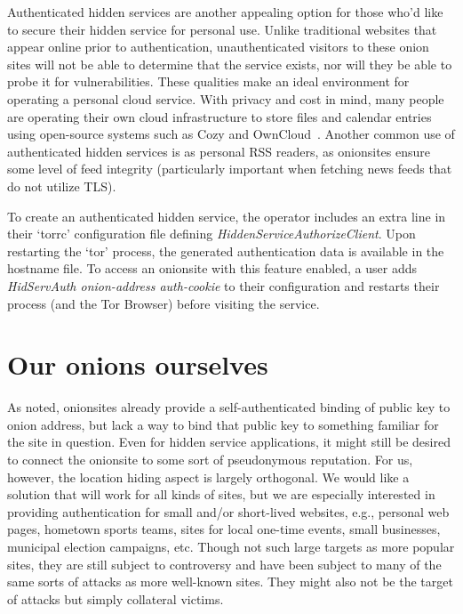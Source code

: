 \documentclass[10pt, conference, compsocconf]{styles/IEEEtran}
\begin{document}
Authenticated hidden services are another appealing option for those
who'd like to secure their hidden service for personal use.  Unlike
traditional websites that appear online prior to authentication,
unauthenticated visitors to these onion sites will not be able to
determine that the service exists, nor will they be able to probe it
for vulnerabilities.  These qualities make an ideal environment for
operating a personal cloud service.  With privacy and cost in mind,
many people are operating their own cloud infrastructure to store
files and calendar entries using open-source systems such as Cozy and
OwnCloud~\cite{cozy}.  Another common use of authenticated hidden
services is as personal RSS readers, as onionsites ensure some level
of feed integrity (particularly important when fetching news feeds
that do not utilize TLS).  

To create an authenticated hidden service, the operator includes an
extra line in their `torrc' configuration file defining
\emph{HiddenServiceAuthorizeClient}.  Upon restarting the `tor' process, the generated authentication data is available in the hostname file.  To access an onionsite with this feature enabled, a user adds \emph{HidServAuth onion-address auth-cookie} to their configuration and restarts their process (and the Tor Browser) before visiting the service.


\section{Our onions ourselves}

As noted, onionsites already provide a self-authenticated binding of
public key to onion address, but lack a way to bind that public key to
something familiar for the site in question.  Even for hidden
service applications, it might still be desired to connect the
onionsite to some sort of pseudonymous reputation.  For us, however,
the location hiding aspect is largely orthogonal.  We would like a solution
that will work for all kinds of sites, but we are especially
interested in providing authentication for small and/or short-lived
websites, e.g., personal web pages, hometown sports teams, sites for
local one-time events, small businesses, municipal election campaigns,
etc.  Though not such large targets as more popular sites, they are
still subject to controversy and have been subject to many of the same
sorts of attacks as more well-known sites.  They might also not be
the target of attacks but simply collateral victims. 
\end{document}
